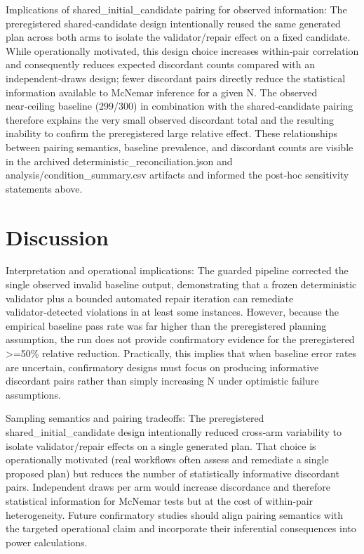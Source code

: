 \documentclass[conference]{IEEEtran}
\begin{document}
Implications of shared\_initial\_candidate pairing for observed information: The preregistered shared‑candidate design intentionally reused the same generated plan across both arms to isolate the validator/repair effect on a fixed candidate. While operationally motivated, this design choice increases within‑pair correlation and consequently reduces expected discordant counts compared with an independent‑draws design; fewer discordant pairs directly reduce the statistical information available to McNemar inference for a given N. The observed near‑ceiling baseline (299/300) in combination with the shared‑candidate pairing therefore explains the very small observed discordant total and the resulting inability to confirm the preregistered large relative effect. These relationships between pairing semantics, baseline prevalence, and discordant counts are visible in the archived deterministic\_reconciliation.json and analysis/condition\_summary.csv artifacts and informed the post‑hoc sensitivity statements above.

\section{Discussion}
Interpretation and operational implications: The guarded pipeline corrected the single observed invalid baseline output, demonstrating that a frozen deterministic validator plus a bounded automated repair iteration can remediate validator‑detected violations in at least some instances. However, because the empirical baseline pass rate was far higher than the preregistered planning assumption, the run does not provide confirmatory evidence for the preregistered >=50\% relative reduction. Practically, this implies that when baseline error rates are uncertain, confirmatory designs must focus on producing informative discordant pairs rather than simply increasing N under optimistic failure assumptions.

Sampling semantics and pairing tradeoffs: The preregistered shared\_initial\_candidate design intentionally reduced cross‑arm variability to isolate validator/repair effects on a single generated plan. That choice is operationally motivated (real workflows often assess and remediate a single proposed plan) but reduces the number of statistically informative discordant pairs. Independent draws per arm would increase discordance and therefore statistical information for McNemar tests but at the cost of within‑pair heterogeneity. Future confirmatory studies should align pairing semantics with the targeted operational claim and incorporate their inferential consequences into power calculations.
\end{document}
